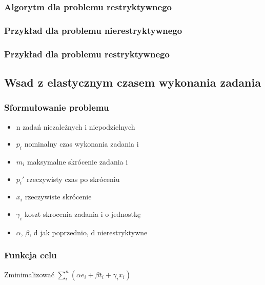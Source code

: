 \documentclass[12pt,a4paper]{article}
\begin{document}
\subsubsection{Algorytm dla problemu restryktywnego}
\subsubsection{Przykład dla problemu nierestryktywnego}
\subsubsection{Przykład dla problemu restryktywnego}
\subsection{Wsad z elastycznym czasem wykonania zadania}
\subsubsection{Sformułowanie problemu}
\begin{itemize}
\item n zadań niezależnych i niepodzielnych
\item $p_{i}$ nominalny czas wykonania zadania i
\item $m_{i}$ maksymalne skrócenie zadania i
\item $p_{i}'$ rzeczywisty czas po skróceniu
\item $x_{i}$ rzeczywiste skrócenie
\item $\gamma_{i}$ koszt skrocenia zadania i o jednostkę
\item $\alpha$, $\beta$, d jak poprzednio, d nierestryktywne
\end{itemize}
\subsubsection{Funkcja celu}
Zminimalizować $\sum\limits_{i}^{n}(\alpha e_{i}+\beta t_{i} + \gamma_{i}x_{i})$
\end{document}
